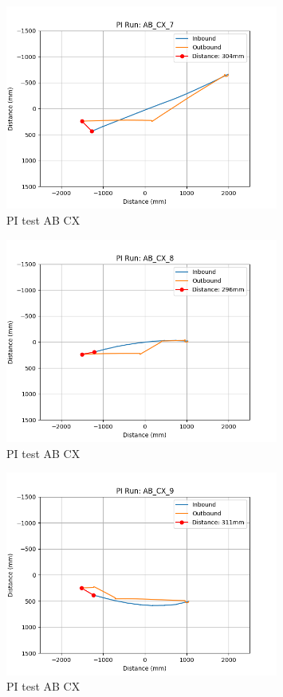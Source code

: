 \documentclass[a4paper,11pt,twoside,openright]{article}
\begin{document}
\begin{figure}[h!]
  \centering
  \includegraphics[width=0.8\textwidth]{AB_CX_7}
  \caption{\label{fig:abcx7} PI test AB\textunderscore
    CX}
\end{figure}

\begin{figure}[h!]
  \centering
  \includegraphics[width=0.8\textwidth]{AB_CX_8}
  \caption{\label{fig:abcx8} PI test AB\textunderscore
    CX}
\end{figure}

\begin{figure}[h!]
  \centering
  \includegraphics[width=0.8\textwidth]{AB_CX_9}
  \caption{\label{fig:abcx9} PI test AB\textunderscore
    CX}
\end{figure}
\end{document}
